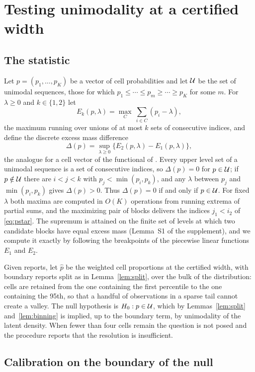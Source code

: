 \section{Testing unimodality at a certified width}\label{sec:test}

\subsection{The statistic}

Let $p=(p_1,\dots,p_K)$ be a vector of cell probabilities and let $\mathcal{U}$ be the set of unimodal sequences, those for which $p_1\le\cdots\le p_m\ge\cdots\ge p_K$ for some $m$. For $\lambda\ge0$ and $k\in\{1,2\}$ let
\[
E_k(p,\lambda)=\max_{C}\ \sum_{i\in C}(p_i-\lambda),
\]
the maximum running over unions of at most $k$ sets of consecutive indices, and define the discrete excess mass difference
\[
\Delta(p)=\sup_{\lambda\ge0}\bigl\{E_2(p,\lambda)-E_1(p,\lambda)\bigr\},
\]
the analogue for a cell vector of the functional of \citet{MullerSawitzki1991}. Every upper level set of a unimodal sequence is a set of consecutive indices, so $\Delta(p)=0$ for $p\in\mathcal{U}$; if $p\notin\mathcal{U}$ there are $i<j<k$ with $p_j<\min(p_i,p_k)$, and any $\lambda$ between $p_j$ and $\min(p_i,p_k)$ gives $\Delta(p)>0$. Thus $\Delta(p)=0$ if and only if $p\in\mathcal{U}$. For fixed $\lambda$ both maxima are computed in $O(K)$ operations from running extrema of partial sums, and the maximizing pair of blocks delivers the indices $j_1<i_2$ of \eqref{eq:pstar}. The supremum is attained on the finite set of levels at which two candidate blocks have equal excess mass (Lemma~S1 of the supplement), and we compute it exactly by following the breakpoints of the piecewise linear functions $E_1$ and $E_2$.

Given reports, let $\hat p$ be the weighted cell proportions at the certified width, with boundary reports split as in Lemma~\ref{lem:split}, over the bulk of the distribution: cells are retained from the one containing the first percentile to the one containing the 95th, so that a handful of observations in a sparse tail cannot create a valley. The null hypothesis is $H_0:p\in\mathcal{U}$, which by Lemmas~\ref{lem:split} and~\ref{lem:binning} is implied, up to the boundary term, by unimodality of the latent density. When fewer than four cells remain the question is not posed and the procedure reports that the resolution is insufficient.

\subsection{Calibration on the boundary of the null}

